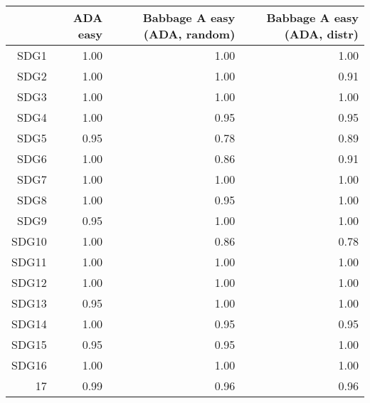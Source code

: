 \begin{table}[ht]
\centering
\begin{tabular}{rrrr}
  \hline
 & ADA easy & Babbage A easy (ADA, random) & Babbage A easy (ADA, distr) \\ 
  \hline
SDG1 & 1.00 & 1.00 & 1.00 \\ 
  SDG2 & 1.00 & 1.00 & 0.91 \\ 
  SDG3 & 1.00 & 1.00 & 1.00 \\ 
  SDG4 & 1.00 & 0.95 & 0.95 \\ 
  SDG5 & 0.95 & 0.78 & 0.89 \\ 
  SDG6 & 1.00 & 0.86 & 0.91 \\ 
  SDG7 & 1.00 & 1.00 & 1.00 \\ 
  SDG8 & 1.00 & 0.95 & 1.00 \\ 
  SDG9 & 0.95 & 1.00 & 1.00 \\ 
  SDG10 & 1.00 & 0.86 & 0.78 \\ 
  SDG11 & 1.00 & 1.00 & 1.00 \\ 
  SDG12 & 1.00 & 1.00 & 1.00 \\ 
  SDG13 & 0.95 & 1.00 & 1.00 \\ 
  SDG14 & 1.00 & 0.95 & 0.95 \\ 
  SDG15 & 0.95 & 0.95 & 1.00 \\ 
  SDG16 & 1.00 & 1.00 & 1.00 \\ 
  17 & 0.99 & 0.96 & 0.96 \\ 
   \hline
\end{tabular}
\end{table}
